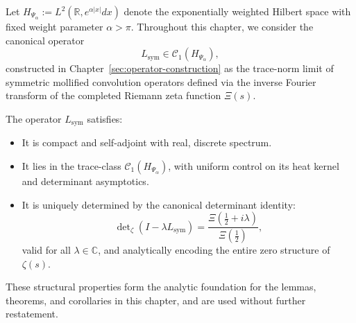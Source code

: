 \begin{remark}
\label{rem:setup_operator_framework}
Let \( H_{\Psi_\alpha} := L^2(\mathbb{R}, e^{\alpha|x|} dx) \) denote the exponentially weighted Hilbert space with fixed weight parameter \( \alpha > \pi \). Throughout this chapter, we consider the canonical operator
\[
L_{\mathrm{sym}} \in \mathcal{C}_1(H_{\Psi_\alpha}),
\]
constructed in Chapter~\ref{sec:operator-construction} as the trace-norm limit of symmetric mollified convolution operators defined via the inverse Fourier transform of the completed Riemann zeta function \( \Xi(s) \).

The operator \( L_{\mathrm{sym}} \) satisfies:
\begin{itemize}
  \item It is compact and self-adjoint with real, discrete spectrum.
  \item It lies in the trace-class \( \mathcal{C}_1(H_{\Psi_\alpha}) \), with uniform control on its heat kernel and determinant asymptotics.
  \item It is uniquely determined by the canonical determinant identity:
  \[
  \det\nolimits_{\zeta}(I - \lambda L_{\mathrm{sym}}) = \frac{\Xi\left( \tfrac{1}{2} + i\lambda \right)}{\Xi\left( \tfrac{1}{2} \right)},
  \]
  valid for all \( \lambda \in \mathbb{C} \), and analytically encoding the entire zero structure of \( \zeta(s) \).
\end{itemize}

These structural properties form the analytic foundation for the lemmas, theorems, and corollaries in this chapter, and are used without further restatement.
\end{remark}
